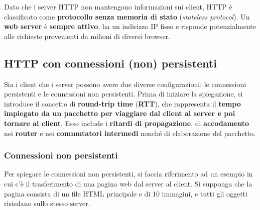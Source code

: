\documentclass[a4paper]{article}
\begin{document}
	\noindent
	Dato che i server HTTP non mantengono informazioni sui client, HTTP è classificato come \textbf{protocollo senza memoria di stato} (\emph{stateless protocol}). Un \textbf{web server} è \textbf{sempre attivo}, ha un indirizzo IP fisso e risponde potenzialmente alle richieste provenienti da milioni di diversi browser.
	
	\subsection{HTTP con connessioni (non) persistenti}
	
	Sia i client che i server possono avere due diverse configurazioni: le connessioni persistenti e le connessioni non persistenti. Prima di iniziare la spiegazione, si introduce il concetto di \textcolor{Red3}{\textbf{round-trip time}} (\textbf{RTT}), che rappresenta il \textbf{tempo impiegato da un pacchetto per viaggiare dal client al server e poi tornare al client}. Esso include i \textbf{ritardi di propagazione}, di \textbf{accodamento} nei \textbf{router} e nei \textbf{commutatori intermedi} nonché di elaborazione del pacchetto.
	
	\newpage
	
	\subsubsection{Connessioni non persistenti}
	
	Per spiegare le connessioni non persistenti, si faccia riferimento ad un esempio in cui c’è il trasferimento di una pagina web dal server al client. Si supponga che la pagina consista di un file HTML principale e di 10 immagini, e tutti gli oggetti risiedano sullo stesso server.
	
\end{document}
